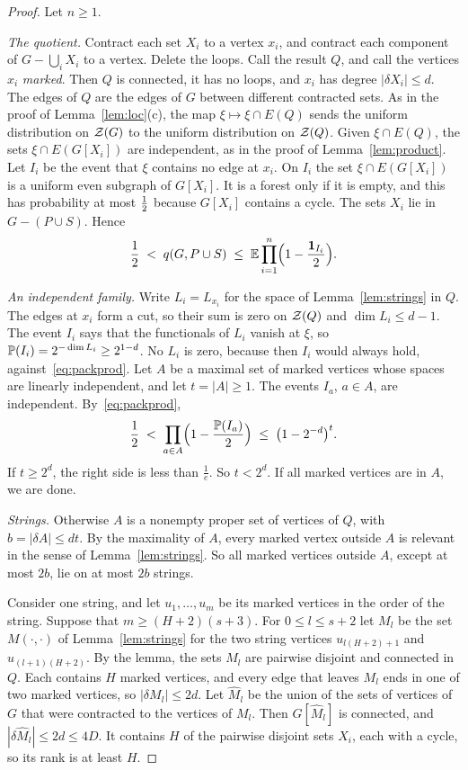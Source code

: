 \begin{proof}
Let $n\ge1$.

\emph{The quotient.} Contract each set $X_i$ to a vertex $x_i$, and contract each component of
$G-\bigcup_iX_i$ to a vertex. Delete the loops. Call the result $Q$, and call the vertices $x_i$
\emph{marked}. Then $Q$ is connected, it has no loops, and $x_i$ has degree $|\delta X_i|\le d$.
The edges of $Q$ are the edges of $G$ between different contracted sets. As in the proof of
Lemma~\ref{lem:loc}(c), the map $\xi\mapsto\xi\cap E(Q)$ sends the uniform distribution on $\mathcal{Z}(G)$
to the uniform distribution on $\mathcal{Z}(Q)$. Given $\xi\cap E(Q)$, the sets $\xi\cap E(G[X_i])$ are
independent, as in the proof of Lemma~\ref{lem:product}. Let $I_i$ be the event that $\xi$ contains
no edge at $x_i$. On $I_i$ the set $\xi\cap E(G[X_i])$ is a uniform even subgraph of $G[X_i]$. It
is a forest only if it is empty, and this has probability at most $\tfrac12$ because $G[X_i]$ contains
a cycle. The sets $X_i$ lie in $G-(P\cup S)$. Hence
\begin{equation}\label{eq:packprod}
  \frac12\;<\;q(G,P\cup S)\;\le\;\mathbb{E}\prod_{i=1}^{n}\Bigl(1-\frac{\mathbf 1_{I_i}}2\Bigr).
\end{equation}

\emph{An independent family.} Write $L_i=L_{x_i}$ for the space of Lemma~\ref{lem:strings} in $Q$.
The edges at $x_i$ form a cut, so their sum is zero on $\mathcal{Z}(Q)$ and $\dim L_i\le d-1$. The event
$I_i$ says that the functionals of $L_i$ vanish at $\xi$, so $\mathbb{P}(I_i)=2^{-\dim L_i}\ge2^{1-d}$.
No $L_i$ is zero, because then $I_i$ would always hold, against~\eqref{eq:packprod}. Let $A$ be a
maximal set of marked vertices whose spaces are linearly independent, and let $t=|A|\ge1$. The
events $I_a$, $a\in A$, are independent. By~\eqref{eq:packprod},
\[
  \frac12\;<\;\prod_{a\in A}\Bigl(1-\frac{\mathbb{P}(I_a)}2\Bigr)\;\le\;\bigl(1-2^{-d}\bigr)^{t}.
\]
If $t\ge2^{d}$, the right side is less than $\frac1e$. So $t<2^{d}$. If all marked vertices are in
$A$, we are done.

\emph{Strings.} Otherwise $A$ is a nonempty proper set of vertices of $Q$, with
$b=|\delta A|\le dt$. By the maximality of $A$, every marked vertex outside $A$ is relevant in the
sense of Lemma~\ref{lem:strings}. So all marked vertices outside $A$, except at most $2b$, lie on at
most $2b$ strings.

Consider one string, and let $u_1,\dots,u_m$ be its marked vertices in the order of the string.
Suppose that $m\ge(H+2)(s+3)$. For $0\le l\le s+2$ let $M_l$ be the set $M(\cdot,\cdot)$ of
Lemma~\ref{lem:strings} for the two string vertices $u_{l(H+2)+1}$ and $u_{(l+1)(H+2)}$. By the
lemma, the sets $M_l$ are pairwise disjoint and connected in $Q$. Each contains $H$ marked
vertices, and every edge that leaves $M_l$ ends in one of two marked vertices, so
$|\delta M_l|\le2d$. Let $\widehat M_l$ be the union of the sets of vertices of $G$ that were
contracted to the vertices of $M_l$. Then $G[\widehat M_l]$ is connected, and
$|\delta\widehat M_l|\le2d\le4D$. It contains $H$ of the pairwise disjoint sets $X_i$, each with
a cycle, so its rank is at least $H$.


\end{proof}
